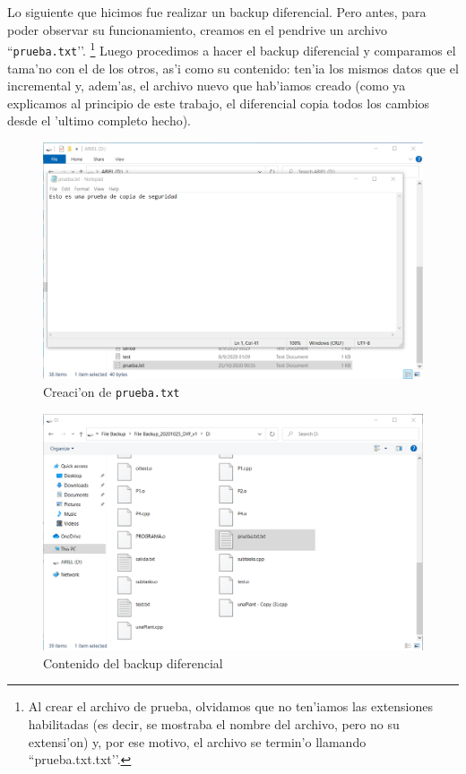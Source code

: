 \documentclass[11pt]{article}
\begin{document}
    Lo siguiente que hicimos fue realizar un backup diferencial. Pero antes, para poder observar su funcionamiento, creamos en el pendrive un archivo ``\texttt{prueba.txt}’’. \footnote{Al crear el archivo de prueba, olvidamos que no ten'iamos las extensiones habilitadas (es decir, se mostraba el nombre del archivo, pero no su extensi'on) y, por ese motivo, el archivo se termin'o llamando ``prueba.txt.txt’’.} Luego procedimos a hacer el backup diferencial y comparamos el tama'no con el de los otros, as'i como su contenido: ten'ia los mismos datos que el incremental y, adem'as, el archivo nuevo que hab'iamos creado (como ya explicamos al principio de este trabajo, el diferencial copia todos los cambios desde el 'ultimo completo hecho). 

    \begin{figure}[H]
		\centering
		\includegraphics[width=.8\textwidth]{Images/easeus/pendrive/9-pruebatxt.png}
		\caption{Creaci'on de \texttt{prueba.txt}}
	\end{figure}
	
	\begin{figure}[H]
		\centering
		\includegraphics[width=.8\textwidth]{Images/easeus/pendrive/10-t2_difv1_c1.png}
		\caption{Contenido del backup diferencial}
	\end{figure}
        
\end{document}
